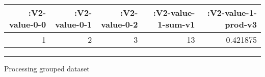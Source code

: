 \documentclass[]{article}
\newenvironment{Shaded}{\begin{snugshade}}{\end{snugshade}}
\newcommand{\KeywordTok}[1]{\textcolor[rgb]{0.13,0.29,0.53}{\textbf{#1}}}
\newcommand{\DecValTok}[1]{\textcolor[rgb]{0.00,0.00,0.81}{#1}}
\newcommand{\StringTok}[1]{\textcolor[rgb]{0.31,0.60,0.02}{#1}}
\newcommand{\VariableTok}[1]{\textcolor[rgb]{0.00,0.00,0.00}{#1}}
\newcommand{\AttributeTok}[1]{\textcolor[rgb]{0.77,0.63,0.00}{#1}}
\newcommand{\NormalTok}[1]{#1}
\begin{document}
\begin{longtable}[]{@{}rrrrr@{}}
\toprule
\begin{minipage}[b]{0.15\columnwidth}\raggedleft\strut
:V2-value-0-0\strut
\end{minipage} & \begin{minipage}[b]{0.15\columnwidth}\raggedleft\strut
:V2-value-0-1\strut
\end{minipage} & \begin{minipage}[b]{0.15\columnwidth}\raggedleft\strut
:V2-value-0-2\strut
\end{minipage} & \begin{minipage}[b]{0.20\columnwidth}\raggedleft\strut
:V2-value-1-sum-v1\strut
\end{minipage} & \begin{minipage}[b]{0.21\columnwidth}\raggedleft\strut
:V2-value-1-prod-v3\strut
\end{minipage}\tabularnewline
\midrule
\endhead
\begin{minipage}[t]{0.15\columnwidth}\raggedleft\strut
1\strut
\end{minipage} & \begin{minipage}[t]{0.15\columnwidth}\raggedleft\strut
2\strut
\end{minipage} & \begin{minipage}[t]{0.15\columnwidth}\raggedleft\strut
3\strut
\end{minipage} & \begin{minipage}[t]{0.20\columnwidth}\raggedleft\strut
13\strut
\end{minipage} & \begin{minipage}[t]{0.21\columnwidth}\raggedleft\strut
0.421875\strut
\end{minipage}\tabularnewline
\bottomrule
\end{longtable}

\begin{center}\rule{0.5\linewidth}{0.5pt}\end{center}

Processing grouped dataset

\begin{Shaded}
\end{Shaded}
\end{document}
